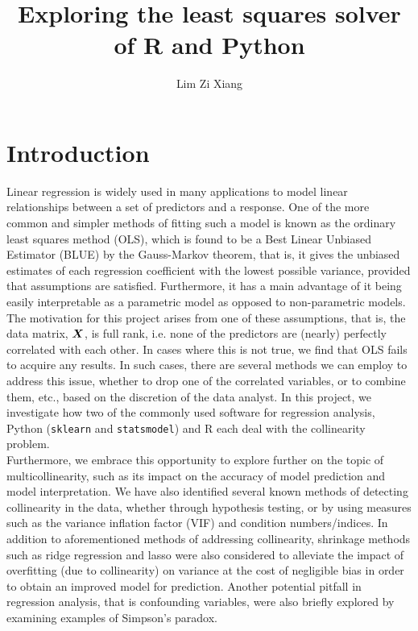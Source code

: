 \documentclass[12pt]{article}
\title{Exploring the least squares solver of R and Python}
\author{Lim Zi Xiang}
\date{}
\begin{document}
	\tableofcontents
	\pagebreak
	
	\section{Introduction}
	
	Linear regression is widely used in many applications to model linear relationships between a set of predictors and a response. One of the more common and simpler methods of fitting such a model is known as the ordinary least squares method (OLS), which is found to be a Best Linear Unbiased Estimator (BLUE) by the Gauss-Markov theorem, that is, it gives the unbiased estimates of each regression coefficient with the lowest possible variance, provided that assumptions are satisfied. Furthermore, it has a main advantage of it being easily interpretable as a parametric model as opposed to non-parametric models.\\
	
	\setlength\parindent{24pt} The motivation for this project arises from one of these assumptions, that is, the data matrix, $\boldsymbol{X}$, is full rank, i.e. none of the predictors are (nearly) perfectly correlated with each other. In cases where this is not true, we find that OLS fails to acquire any results. In such cases, there are several methods we can employ to address this issue, whether to drop one of the correlated variables, or to combine them, etc., based on the discretion of the data analyst. In this project, we investigate how two of the commonly used software for regression analysis, Python (\texttt{sklearn} and \texttt{statsmodel}) and R each deal with the collinearity problem.\\
	
	Furthermore, we embrace this opportunity to explore further on the topic of multicollinearity, such as its impact on the accuracy of model prediction and model interpretation. We have also identified several known methods of detecting collinearity in the data, whether through hypothesis testing, or by using measures such as the variance inflation factor (VIF) and condition numbers/indices. In addition to aforementioned methods of addressing collinearity, shrinkage methods such as ridge regression and lasso were also considered to alleviate the impact of overfitting (due to collinearity) on variance at the cost of negligible bias in order to obtain an improved model for prediction. Another potential pitfall in regression analysis, that is confounding variables, were also briefly explored by examining examples of Simpson's paradox.\\
	
\end{document}
